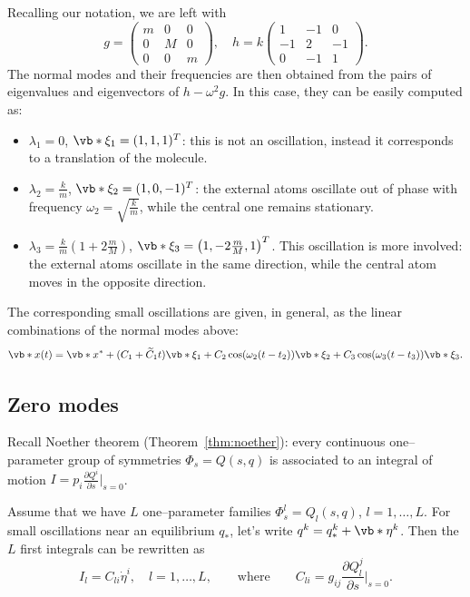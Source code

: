 \documentclass[english,fontsize=11pt,paper=b5]{scrbook}
\numberwithin{equation}{chapter}
\theoremstyle{definition}
\begin{document}
    Recalling our notation, we are left with
    \begin{equation}
      g = \begin{pmatrix}m&0&0\\0&M&0\\0&0&m\end{pmatrix},
      \quad
      h = k\begin{pmatrix}1&-1&0\\-1&2&-1\\0&-1&1\end{pmatrix}.
    \end{equation}
    The normal modes and their frequencies are then obtained from the pairs of eigenvalues and eigenvectors of $h - \omega^2 g$. In this case, they can be easily computed as:
    \begin{itemize}
      \item $\lambda_1 = 0$, $\vb*{\xi}_1 = (1,1,1)^T$: this is not an oscillation, instead it corresponds to a translation of the molecule.
      \item $\lambda_2 = \frac km$, $\vb*{\xi}_2 = (1,0,-1)^T$: the external atoms oscillate out of phase with frequency $\omega_2 = \sqrt{\frac km}$, while the central one remains stationary.
      \item $\lambda_3 = \frac km \left(1+2 \frac mM\right)$, $\vb*{\xi}_3 = \left(1,-2\frac mM,1\right)^T$. This oscillation is more involved: the external atoms oscillate in the same direction, while the central atom moves in the opposite direction.
    \end{itemize}
    The corresponding small oscillations are given, in general, as the linear combinations of the normal modes above:
    \begin{equation}
      \vb*{x}(t) = \vb*{x}^* + (C_1 + \widetilde C_1 t) \vb*{\xi}_1 + C_2 \cos(\omega_2 (t-t_2)) \vb*{\xi}_2 + C_3 \cos(\omega_3 (t-t_3)) \vb*{\xi}_3.
    \end{equation}

    \subsection{Zero modes}

    Recall Noether theorem (Theorem~\ref{thm:noether}): every continuous one--parameter group of symmetries $\Phi_s = Q(s,q)$ is associated to an integral of motion $I = p_i \frac{\partial Q^i}{\partial s}\big|_{s=0}$.

    Assume that we have $L$ one--parameter families $\Phi^l_s = Q_l(s,q)$, $l=1,\ldots,L$.
    For small oscillations near an equilibrium $q_*$, let's write $q^k = q^k_* + \vb*{\eta}^k$. Then the $L$ first integrals can be rewritten as
    \begin{equation}
      I_l = C_{li} \dot\eta^i,\quad l=1,\ldots, L,
      \qquad\mbox{where}\qquad
      C_{li} = g_{ij} \frac{\partial Q^j_l}{\partial s}\Big|_{s=0}.
    \end{equation}
\end{document}
